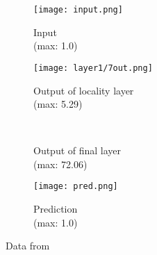 \begin{figure}[h]
	\graphicspath{{resources/models/3neurEx/fullRun/invert/}}
	\begin{subfigure}{.16\textwidth}
		\centering
		\texttt{[image: input.png]}
		\caption{Input\\(max: 1.0)}
	\end{subfigure}
	\hspace{1em}
	\begin{minipage}{.5\textwidth}
		\centering
		\begin{subfigure}{.8\textwidth}
			\centering
			\texttt{[image: layer1/7out.png]}
			\caption{Output of locality layer\\(max: 5.29)}
		\end{subfigure}\\
		\vfill
		\begin{subfigure}{.8\textwidth}
			\centering
			\caption{Output of final layer\\(max: 72.06)}
		\end{subfigure}
	\end{minipage}
	\begin{minipage}{.25\textwidth}
		\centering
		\vspace{-10pt}
		\vspace{1em}
		\begin{subfigure}{\textwidth}
			\centering
			\texttt{[image: pred.png]}
			\caption{Prediction\\(max: 1.0)}
		\end{subfigure}
	\end{minipage}
	\caption{Data from }
\end{figure}
		


